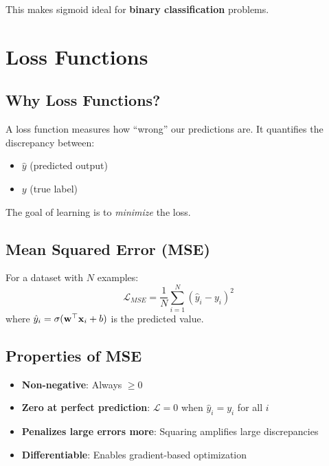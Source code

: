 This makes sigmoid ideal for \textbf{binary classification} problems.


\section{Loss Functions}

\subsection{Why Loss Functions?}

A loss function measures how ``wrong'' our predictions are. It quantifies the discrepancy between:
\begin{itemize}
    \item $\hat{y}$ (predicted output)
    \item $y$ (true label)
\end{itemize}

The goal of learning is to \textit{minimize} the loss.

\subsection{Mean Squared Error (MSE)}

\begin{definitionbox}
For a dataset with $N$ examples:
\[
\mathcal{L}_{MSE} = \frac{1}{N} \sum_{i=1}^{N} (\hat{y}_i - y_i)^2
\]
where $\hat{y}_i = \sigma(\mathbf{w}^\top \mathbf{x}_i + b)$ is the predicted value.
\end{definitionbox}

\subsection{Properties of MSE}

\begin{itemize}
    \item \textbf{Non-negative}: Always $\geq 0$
    \item \textbf{Zero at perfect prediction}: $\mathcal{L} = 0$ when $\hat{y}_i = y_i$ for all $i$
    \item \textbf{Penalizes large errors more}: Squaring amplifies large discrepancies
    \item \textbf{Differentiable}: Enables gradient-based optimization
\end{itemize}

